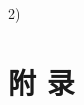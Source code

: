 \documentclass{cumcmart}
\begin{document}
2)	





\newpage
\appendix
\section*{附 \quad 录}
\end{document}
